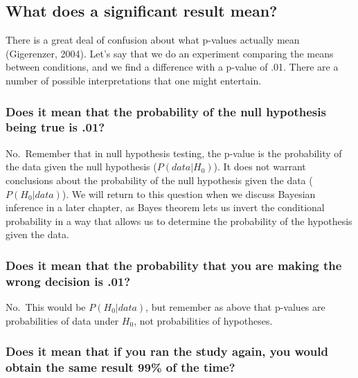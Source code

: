 \documentclass[12pt,]{book}
\theoremstyle{definition}
\theoremstyle{definition}
\theoremstyle{definition}
\theoremstyle{remark}
\begin{document}
\hypertarget{what-does-a-significant-result-mean}{%
\subsection{What does a significant result mean?}\label{what-does-a-significant-result-mean}}

There is a great deal of confusion about what p-values actually mean (Gigerenzer, 2004). Let's say that we do an experiment comparing the means between conditions, and we find a difference with a p-value of .01. There are a number of possible interpretations that one might entertain.

\hypertarget{does-it-mean-that-the-probability-of-the-null-hypothesis-being-true-is-.01}{%
\subsubsection{Does it mean that the probability of the null hypothesis being true is .01?}\label{does-it-mean-that-the-probability-of-the-null-hypothesis-being-true-is-.01}}

No.~Remember that in null hypothesis testing, the p-value is the probability of the data given the null hypothesis (\(P(data|H_0)\)). It does not warrant conclusions about the probability of the null hypothesis given the data (\(P(H_0|data)\)). We will return to this question when we discuss Bayesian inference in a later chapter, as Bayes theorem lets us invert the conditional probability in a way that allows us to determine the probability of the hypothesis given the data.

\hypertarget{does-it-mean-that-the-probability-that-you-are-making-the-wrong-decision-is-.01}{%
\subsubsection{Does it mean that the probability that you are making the wrong decision is .01?}\label{does-it-mean-that-the-probability-that-you-are-making-the-wrong-decision-is-.01}}

No.~This would be \(P(H_0|data)\), but remember as above that p-values are probabilities of data under \(H_0\), not probabilities of hypotheses.

\hypertarget{does-it-mean-that-if-you-ran-the-study-again-you-would-obtain-the-same-result-99-of-the-time}{%
\subsubsection{Does it mean that if you ran the study again, you would obtain the same result 99\% of the time?}\label{does-it-mean-that-if-you-ran-the-study-again-you-would-obtain-the-same-result-99-of-the-time}}
\end{document}
